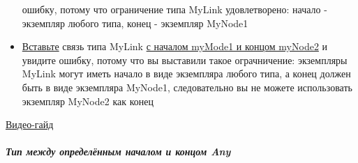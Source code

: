\begin{itemize}
            ошибку, потому что ограничение типа MyLink удовлетворено: начало -
            экземпляр
            любого типа, конец - экземпляр MyNode1
      \item \hyperlink{DeepCase.InsertLink.Description}{Вставьте} связь типа
            MyLink
            \hyperlink{FAQ.HowToInsertLinkWithFromAndTo}{с началом myMode1 и
                  концом
                  myNode2} и увидите ошибку, потому что вы выставили такое
            ограчничение:
            экземпляры MyLink могут иметь начало в виде экземпляра любого типа,
            а
            конец
            должен быть в виде экземпляра MyNode1, следовательно вы не можете
            использовать
            экземпляр MyNode2 как конец
\end{itemize}
\href{https://youtu.be/XOVLeJfdqQM}{Видео-гайд}
\subparagraph{Тип между определённым началом и концом Any}
